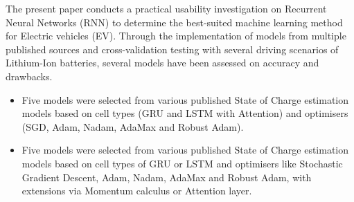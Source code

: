%
{
The present paper conducts a practical usability investigation on Recurrent Neural Networks (RNN) to determine the best-suited machine learning method for Electric vehicles (EV).
Through the implementation of models from multiple published sources and cross-validation testing with several driving scenarios of Lithium-Ion batteries, several models have been assessed on accuracy and drawbacks.%
\begin{itemize}
    \item Five models were selected from various published State of Charge estimation models based on cell types (GRU and LSTM with Attention) and optimisers (SGD, Adam, Nadam, AdaMax and Robust Adam).
    \item Five models were selected from various published State of Charge estimation models based on cell types of GRU or LSTM and optimisers like Stochastic Gradient Descent, Adam, Nadam, AdaMax and Robust Adam, with extensions via Momentum calculus or Attention layer.
\end{itemize}
}
